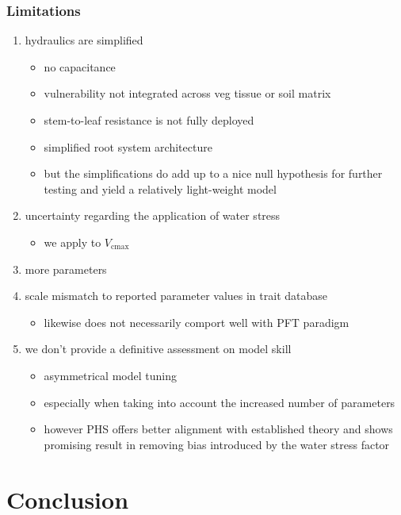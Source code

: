 \documentclass[draft,linenumbers]{agujournal}
\begin{document}
\subsubsection{Limitations}
\begin{enumerate}
    \item hydraulics are simplified
    \begin{itemize}
        \item no capacitance
        \item vulnerability not integrated across veg tissue or soil matrix
        \item stem-to-leaf resistance is not fully deployed
        \item simplified root system architecture
        \item but the simplifications do add up to a nice null hypothesis for further testing and yield a relatively light-weight model
    \end{itemize}
    \item uncertainty regarding the application of water stress
    \begin{itemize}
        \item we apply to $V_{\text{cmax}}$
    \end{itemize}
    \item more parameters
    \item scale mismatch to reported parameter values in trait database 
    \begin{itemize}
        \item likewise does not necessarily comport well with PFT paradigm
    \end{itemize}
    \item we don't provide a definitive assessment on model skill
    \begin{itemize}
        \item asymmetrical model tuning
        \item especially when taking into account the increased number of parameters
        \item however PHS offers better alignment with established theory and shows promising result in removing bias introduced by the water stress factor
    \end{itemize}
    
\end{enumerate}

\section{Conclusion}
\end{document}
